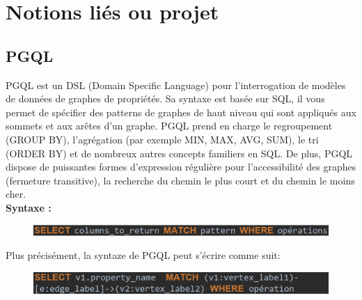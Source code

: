 \chapter{Notions liés ou projet}

\section{PGQL}
PGQL est un DSL (Domain Specific Language) pour l'interrogation de modèles de données de graphes de propriétés. Sa syntaxe est basée sur SQL, il vous permet de spécifier des patterns de graphes de haut niveau qui sont appliqués aux sommets et aux arêtes d'un graphe. PGQL prend en charge le regroupement (GROUP BY), l'agrégation (par exemple MIN, MAX, AVG, SUM), le tri (ORDER BY) et de nombreux autres concepts familiers en SQL. De plus, PGQL dispose de puissantes formes d'expression régulière pour l'accessibilité des graphes (fermeture transitive), la recherche du chemin le plus court et du chemin le moins cher.\\
\textbf{Syntaxe :}
\begin{figure}[H]  
  \centering
    \includegraphics[width=1\textwidth]{annexe/Figures/PGQL_syntaxe1.png}
\end{figure}

Plus précisément, la syntaze de PGQL peut s'écrire comme suit:
\begin{figure}[H]  
  \centering
    \includegraphics[width=1\textwidth]{annexe/Figures/PGQL_syntaxe2.png}
\end{figure}

